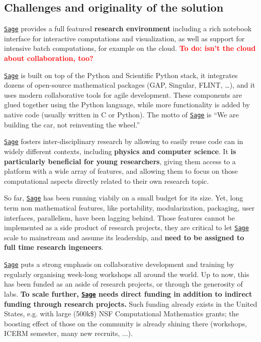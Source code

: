 \documentclass[a4,12pt]{amsart}
\newcommand{\sage}{\href{http://www.sagemath.org/}{\texttt{Sage}}\xspace}
\newcommand{\TODO}[2][To do: ]{{\textcolor{red}{\textbf{#1#2}}}}
\begin{document}
\subsection{Challenges and originality of the solution}

\sage provides a full featured \textbf{research environment} including
a rich notebook interface for interactive computations and
visualization, as well as support for intensive batch computations,
for example on the cloud. \TODO{isn't the cloud about collaboration, too?}

\sage is built on top of the Python and Scientific Python stack, it
integrates dozens of open-source mathematical packages (GAP, Singular,
FLINT, \dots), and it uses modern collaborative tools for agile
development. These components are glued together using the Python
language, while more functionality is added by native code (usually
written in C or Python).  The motto of \sage is ``We are building the
car, not reinventing the wheel.''

\sage fosters inter-disciplinary research by allowing to easily reuse
code can in widely different contexts, including \textbf{physics and
  computer science}. It \textbf{is particularly beneficial for young researchers},
giving them access to a platform with a wide array of features, and
allowing them to focus on those computational aspects directly related
to their own research topic. 

So far, \sage has been running viabily on a small budget for its
size. Yet, long term non mathematical features, like portability,
modularization, packaging, user interfaces, parallelism, have been
lagging behind.  Those features cannot be implemented as a side
product of research projects, they are critical to let \sage scale to
mainstream and assume its leadership, and \textbf{need to be assigned
  to full time research ingeneers}.
  
\sage puts a strong emphasis on collaborative development and training
by regularly organising week-long workshops all around the world.  Up
to now, this has been funded as an aside of research projects, or
through the generosity of labs.  \textbf{To scale further, \sage needs
  direct funding in addition to indirect funding through research
  projects.} Such funding already exists in the United States,
e.g. with large (500k\$) NSF Computational Mathematics grants; the
boosting effect of those on the community is already shining there
(workshops, ICERM semester, many new recruits, ...).
\end{document}
